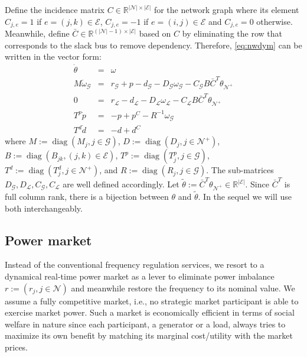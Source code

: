 \documentclass[journal,12pt,onecolumn,draftclsnofoot]{IEEEtran}
\newcommand{\diag}{\mathop{\mathrm{diag}}}
\begin{document}
Define the incidence matrix $C \in \mathbb{R}^{|\mathcal{N}|\times|\mathcal{E}|}$ for the network graph where its element $C_{j,e}=1$ if $e=(j,k)\in\mathcal{E}$, $C_{j,e}=-1$ if $e=(i,j)\in\mathcal{E}$ and $C_{j,e}=0$ otherwise. Meanwhile, define $\bar C \in \mathbb{R}^{(|\mathcal{N}|-1)\times|\mathcal{E}|}$ based on $C$ by eliminating the row that corresponds to the slack bus to remove dependency. 
Therefore, \eqref{eq:nwdym} can be written in the vector form:
  \begin{subequations}
  	\begin{eqnarray}
  	\label{eq:nwdymvec:1}
  	\dot \theta 	& = &  \omega \\
  	\label{eq:nwdymvec:2}
  	M \dot \omega_\mathcal{G} & = & r_\mathcal{G} +p  - d_\mathcal{G}  -D_\mathcal{G}  \omega_\mathcal{G}  - C_{\mathcal{G}}B  \bar C^T \theta_{\mathcal{N}^+} \\
  	\label{eq:nwdymvec:3}
  	0 & = & r_{\mathcal{L}} - d_{\mathcal{L}}  -D_{\mathcal{L}} \omega_{\mathcal{L}} - C_{\mathcal{L}}B \bar C^T\theta_{\mathcal{N}^+} \\
  	\label{eq:nwdymvec:4}
  	T^p \dot p & =  & -p+ p^C-R^{-1}\omega_{\mathcal{G}}  \\
  	\label{eq:nwdymvec:5}
  	T^d \dot d & =  & -d + d^C 
  	\end{eqnarray}\label{eq:nwdymvec}%
  \end{subequations}
where $M:=\diag(M_j,j\in\mathcal{G})$, $D:=\diag(D_j,j\in\mathcal{N}^+)$, $B:=\diag(B_{jk},(j,k)\in\mathcal{E})$, $T^p:=\diag(T^p_j,j\in\mathcal{G})$, $T^d:=\diag(T^d_j,j\in\mathcal{N}^+)$, and $R:=\diag(R_j, j\in\mathcal{G})$. The sub-matrices $D_\mathcal{G},D_{\mathcal{L}},C_{\mathcal{G}},C_{\mathcal{L}}$ are well defined accordingly.
Let $\tilde {\theta}:= \bar C^T \theta_{\mathcal{N}^+}\in\mathbb{R}^{|\mathcal{E}|}$. Since $\bar C^T$ is full column rank, there is a bijection between $\theta$ and $\tilde{\theta}$. In the sequel we will use both interchangeably.


\subsection{Power market}

Instead of the conventional frequency regulation services, we resort to a dynamical real-time power market as a lever to eliminate power imbalance $r:=(r_j,j\in\mathcal{N})$ and meanwhile restore the frequency to its nominal value. We assume a fully competitive market, i.e., no strategic market participant is able to exercise market power. Such a market is economically efficient in terms of social welfare in nature since each participant, a generator or a load, always tries to maximize its own benefit by matching its marginal cost/utility with the market prices.    
\end{document}
